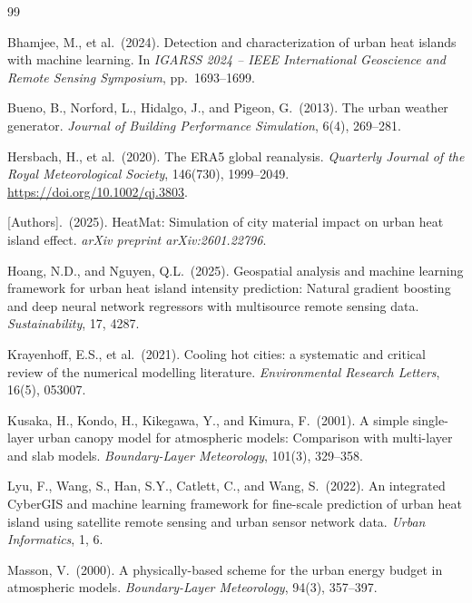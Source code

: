 \documentclass[12pt, letterpaper]{article}
\begin{document}
\begin{thebibliography}{99}

Bhamjee, M., et al.\ (2024).
Detection and characterization of urban heat islands with machine learning.
In \textit{IGARSS 2024 -- IEEE International Geoscience and Remote Sensing
Symposium}, pp.\ 1693--1699.

Bueno, B., Norford, L., Hidalgo, J., and Pigeon, G.\ (2013).
The urban weather generator.
\textit{Journal of Building Performance Simulation}, 6(4), 269--281.

Hersbach, H., et al.\ (2020).
The ERA5 global reanalysis.
\textit{Quarterly Journal of the Royal Meteorological Society},
146(730), 1999--2049.
\url{https://doi.org/10.1002/qj.3803}.

[Authors].\ (2025).
HeatMat: Simulation of city material impact on urban heat island effect.
\textit{arXiv preprint arXiv:2601.22796}.

Hoang, N.D., and Nguyen, Q.L.\ (2025).
Geospatial analysis and machine learning framework for urban heat island
intensity prediction: Natural gradient boosting and deep neural network
regressors with multisource remote sensing data.
\textit{Sustainability}, 17, 4287.

Krayenhoff, E.S., et al.\ (2021).
Cooling hot cities: a systematic and critical review of the numerical
modelling literature.
\textit{Environmental Research Letters}, 16(5), 053007.

Kusaka, H., Kondo, H., Kikegawa, Y., and Kimura, F.\ (2001).
A simple single-layer urban canopy model for atmospheric models:
Comparison with multi-layer and slab models.
\textit{Boundary-Layer Meteorology}, 101(3), 329--358.

Lyu, F., Wang, S., Han, S.Y., Catlett, C., and Wang, S.\ (2022).
An integrated CyberGIS and machine learning framework for fine-scale
prediction of urban heat island using satellite remote sensing and urban
sensor network data.
\textit{Urban Informatics}, 1, 6.

Masson, V.\ (2000).
A physically-based scheme for the urban energy budget in atmospheric models.
\textit{Boundary-Layer Meteorology}, 94(3), 357--397.


\end{thebibliography}
\end{document}
